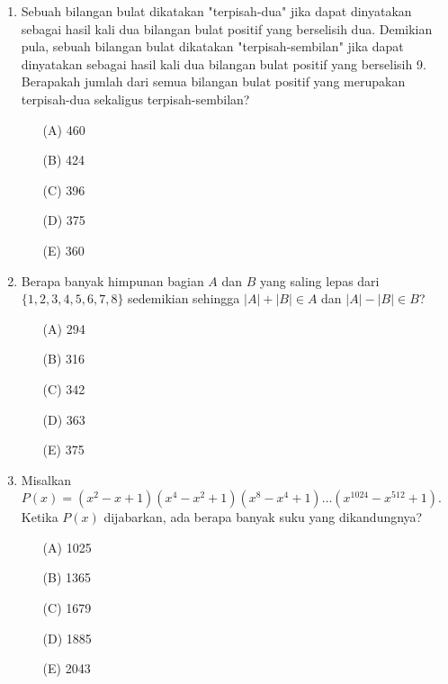 \documentclass[12pt]{scrartcl}
\begin{document}
\begin{enumerate}
    \item Sebuah bilangan bulat dikatakan "terpisah-dua" jika dapat dinyatakan sebagai hasil kali dua bilangan bulat positif yang berselisih dua. Demikian pula, sebuah bilangan bulat dikatakan "terpisah-sembilan" jika dapat dinyatakan sebagai hasil kali dua bilangan bulat positif yang berselisih 9. Berapakah jumlah dari semua bilangan bulat positif yang merupakan terpisah-dua sekaligus terpisah-sembilan?
    \begin{itemize}
        \item[(A)] 460
        \item[(B)] 424
        \item[(C)] 396
        \item[(D)] 375
        \item[(E)] 360
    \end{itemize}

    \item Berapa banyak himpunan bagian $A$ dan $B$ yang saling lepas dari $\{1, 2, 3, 4, 5, 6, 7, 8\}$ sedemikian sehingga $|A|+|B|\in A$ dan $|A|-|B|\in B$?
    \begin{itemize}
        \item[(A)] 294
        \item[(B)] 316
        \item[(C)] 342
        \item[(D)] 363
        \item[(E)] 375
    \end{itemize}

    \item Misalkan $P(x)=(x^{2}-x+1)(x^{4}-x^{2}+1)(x^{8}-x^{4}+1)\dots(x^{1024}-x^{512}+1)$. Ketika $P(x)$ dijabarkan, ada berapa banyak suku yang dikandungnya?
    \begin{itemize}
        \item[(A)] 1025
        \item[(B)] 1365
        \item[(C)] 1679
        \item[(D)] 1885
        \item[(E)] 2043
    \end{itemize}
\end{enumerate}
\end{document}
